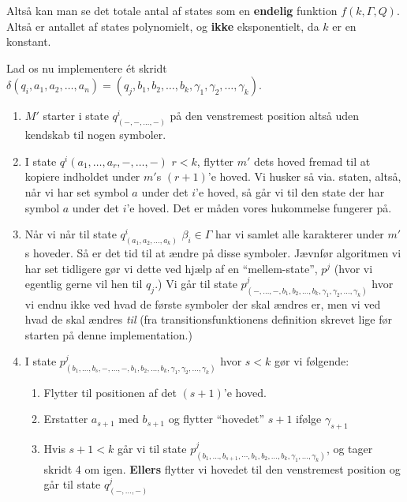 Altså kan man se det totale antal af states som en \textbf{endelig} funktion $f(k, \Gamma, Q)$. Altså er antallet af states polynomielt, og \textbf{ikke} eksponentielt, da $k$ er en konstant.

Lad os nu implementere ét skridt $\delta(q_{i}, a_{1}, a_{2}, \ldots, a_{n}) = (q_{j}, b_{1}, b_{2}, \ldots, b_{k}, \gamma_{1}, \gamma_{2}, \ldots, \gamma_{k})$.
\begin{enumerate}
  \item $M'$ starter i state $q^{i}_{(-,-, \ldots, -)}$ på den venstremest position altså uden kendskab til nogen symboler.
  \item I state $q^{i}(a_{1}, \ldots, a_{r}, -, \ldots, -)$ $r < k$, flytter $m'$ dets hoved fremad til at kopiere indholdet under $m'$s $(r+1)$'e hoved. Vi husker så via. staten, altså, når vi har set symbol $a$ under det $i$'e hoved, så går vi til den state der har symbol $a$ under det $i$'e hoved. Det er måden vores hukommelse fungerer på.
  \item Når vi når til state $q^{i}_{(a_{1}, a_{2}, \ldots, a_{k})}$ $\beta_{i} \in \Gamma$ har vi samlet alle karakterer under $m'$s hoveder. Så er det tid til at ændre på disse symboler. Jævnfør algoritmen vi har set tidligere gør vi dette ved hjælp af en ``mellem-state'', $p^{j}$ (hvor vi egentlig gerne vil hen til $q_{j}$.) Vi går til state $p^{j}_{(-, \ldots, -, b_{1}, b_{2}, \ldots, b_{k}, \gamma_{1}, \gamma_{2}, \ldots, \gamma_{k})}$ hvor vi endnu ikke ved hvad de første symboler der skal ændres er, men vi ved hvad de skal ændres \textit{til} (fra transitionsfunktionens definition skrevet lige før starten på denne implementation.)
  \item I state $p^{j}_{(b_{1}, \ldots, b_{s}, -, \ldots, -, b_{1}, b_{2}, \ldots, b_{k}, \gamma_{1}, \gamma_{2}, \ldots, \gamma_{k})}$ hvor $s < k$ gør vi følgende:
		\begin{enumerate}
		  \item Flytter til positionen af det $(s+1)$'e hoved.
		  \item Erstatter $a_{s+1}$ med $b_{s+1}$ og flytter ``hovedet'' $s+1$ ifølge $\gamma_{s+1}$
		  \item Hvis $s+1<k$ går vi til state $p^{j}_{(b_{1}, \ldots, b_{s+1}, \cdots, b_{1}, b_{2}, \ldots, b_{k}, \gamma_{1}, \ldots, \gamma_{k})}$, og tager skridt 4 om igen. \textbf{Ellers} flytter vi hovedet til den venstremest position og går til state $q^{j}_{(-, \ldots, -)}$
		\end{enumerate}
\end{enumerate}

